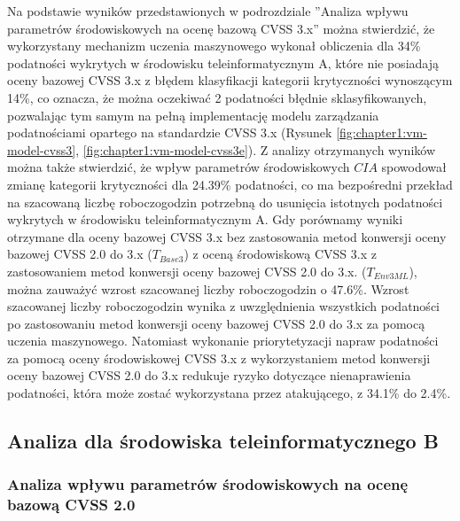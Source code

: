 \bigbreak
Na podstawie wyników przedstawionych w podrozdziale ''Analiza wpływu parametrów środowiskowych na ocenę bazową CVSS 3.x'' można stwierdzić, że wykorzystany mechanizm uczenia maszynowego wykonał obliczenia dla 34\% podatności wykrytych w środowisku teleinformatycznym A, które nie posiadają oceny bazowej CVSS 3.x z błędem klasyfikacji kategorii krytyczności wynoszącym 14\%, co oznacza, że można oczekiwać 2 podatności błędnie sklasyfikowanych, pozwalając tym samym na pełną implementację modelu zarządzania podatnościami opartego na standardzie CVSS 3.x (Rysunek \ref{fig:chapter1:vm-model-cvss3}, \ref{fig:chapter1:vm-model-cvss3e}). Z analizy otrzymanych wyników można także stwierdzić, że wpływ parametrów środowiskowych $CIA$ spowodował zmianę kategorii krytyczności dla 24.39\% podatności, co ma bezpośredni przekład na szacowaną liczbę roboczogodzin potrzebną do usunięcia istotnych podatności wykrytych w środowisku teleinformatycznym A. Gdy porównamy wyniki otrzymane dla oceny bazowej CVSS 3.x bez zastosowania metod konwersji oceny bazowej CVSS 2.0 do 3.x ($T_{Base3}$) z oceną środowiskową CVSS 3.x z zastosowaniem metod konwersji oceny bazowej CVSS 2.0 do 3.x. ($T_{Env3ML}$), można zauważyć wzrost szacowanej liczby roboczogodzin o 47.6\%. Wzrost szacowanej liczby roboczogodzin wynika z uwzględnienia wszystkich podatności po zastosowaniu metod konwersji oceny bazowej CVSS 2.0 do 3.x za pomocą uczenia maszynowego. Natomiast wykonanie priorytetyzacji napraw podatności za pomocą oceny środowiskowej CVSS 3.x z wykorzystaniem metod konwersji oceny bazowej CVSS 2.0 do 3.x redukuje ryzyko dotyczące nienaprawienia podatności, która może zostać wykorzystana przez atakującego, z 34.1\% do 2.4\%.


\subsection{Analiza dla środowiska teleinformatycznego B}



\subsubsection{Analiza wpływu parametrów środowiskowych na ocenę bazową CVSS 2.0}

